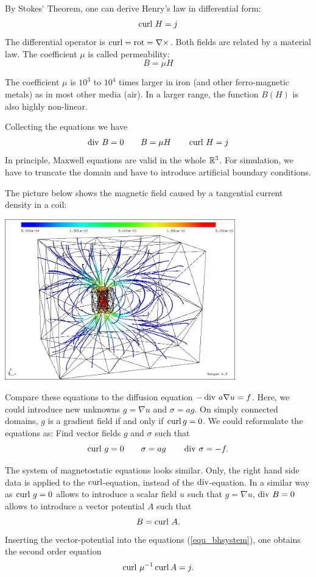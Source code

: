 By Stokes\'{} Theorem, one can derive Henry's law in differential form:
$$
\operatorname{curl} \, H = j
$$
The differential operator is  $\operatorname{curl} = \operatorname {rot} = \nabla \times$.
Both fields are related by a material law. The coefficient $\mu$ is called permeability:
$$
B = \mu H
$$

The coefficient $\mu$ is $10^3$ to $10^4$ times larger in iron (and other ferro-magnetic
metals) as in most other media (air). In a larger range, the function $B(H)$ is also highly
non-linear.

Collecting the equations we have
\begin{equation}
\label{equ_bhsystem}
\operatorname{div} \, B = 0 \qquad B = \mu H \qquad \operatorname{curl} \, H = j
\end{equation}
In principle, Maxwell equations are valid in the whole ${\mathbb R}^3$. For simulation, we have
to truncate the domain and have to introduce  artificial boundary conditions.

The picture below shows the magnetic field caused by a tangential current density in
a coil:
\begin{center}
\includegraphics[width=10cm]{pictures/d7_fieldlines}
\end{center}


Compare these equations to the diffusion equation $-\operatorname{div} \, a \nabla u = f$. Here,
we could introduce new unknowns $g = \nabla u$ and $\sigma = a g$. On simply connected
domains, $g$ is a gradient field if and only if $\operatorname{curl} g = 0$. We could reformulate
the equations as: Find vector fields $g$ and $\sigma$ such that
$$
\operatorname{curl} \, g = 0 \qquad \sigma = a g \qquad \operatorname{div} \, \sigma = -f.
$$

The system of magnetostatic equations looks similar. Only, the right hand side data is
applied to the $\operatorname{curl}$-equation, instead of the $\operatorname{div}$-equation. In a similar way as
$\operatorname{curl} \, g = 0$ allows to introduce a scalar field $u$ such that $g = \nabla u$,
$\operatorname{div} \, B = 0$ allows to introduce a vector potential $A$ such that
$$
B = \operatorname{curl} \, A.
$$
Inserting the vector-potential into the equations (\ref{equ_bhsystem}), one obtains
the second order equation
\begin{equation}
\label{equ_vecpotstrong}
\operatorname{curl} \, \mu^{-1}  \operatorname{curl} A = j.
\end{equation}

